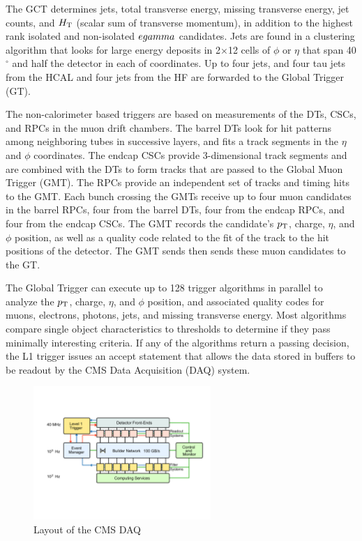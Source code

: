 \par The GCT determines jets, total transverse energy, missing
transverse energy, jet counts, and $H_{\mathrm{T}}$ (scalar sum of transverse
momentum), in addition to the highest rank isolated and non-isolated
$e\/gamma$ candidates.  Jets are found in a clustering algorithm that
looks for large energy deposits in 2$\times$12 cells of $\phi$ or
$\eta$ that span 40$^{\circ}$ and half the detector in each of
coordinates.  Up to four jets, and four tau jets from the HCAL and
four jets from the HF are forwarded to the Global Trigger (GT).  

 \par The non-calorimeter based triggers are based on measurements of
 the DTs, CSCs, and RPCs in the muon drift chambers.  The barrel DTs
 look for hit patterns among neighboring tubes in successive layers,
 and fits a track segments in the $\eta$ and $\phi$ coordinates.  The
 endcap CSCs provide 3-dimensional track segments and are combined
 with the DTs to form tracks that are passed to the Global Muon
 Trigger (GMT).  The RPCs provide an independent set of tracks and
 timing hits to the GMT.  Each bunch crossing the GMTs receive up to
 four muon candidates in the barrel RPCs, four from the barrel DTs,
 four from the endcap RPCs, and four from the endcap CSCs.  The GMT
 records the candidate's $p_{\mathrm{T}}$, charge, $\eta$, and $\phi$ position,
 as well as a quality code related to the fit of the track to the hit
 positions of the detector.  The GMT sends then sends these muon
 candidates to the GT.  

\par The Global Trigger can execute up to 128 trigger algorithms in
parallel to analyze the $p_{\mathrm{T}}$, charge, $\eta$, and $\phi$ position,
and associated quality codes for muons, electrons, photons, jets, and
missing transverse energy.  Most algorithms compare single object
characteristics to thresholds to determine if they pass minimally
interesting criteria.  If any of the algorithms return a passing
decision, the L1 trigger issues an accept statement that allows the
data stored in buffers to be readout by the CMS Data Acquisition (DAQ)
system.  

\begin{figure}[h]
   \centering
  \includegraphics[width=0.6\textwidth]{Figures/CMS_Diagrams/Trigger__DAQ_layout.pdf}
  \caption{Layout of the CMS DAQ
    \cite{CMS:CMS_Machine_Chatrchyan:2008aa}} \label{fig:tigger_daq} 
\end{figure}

